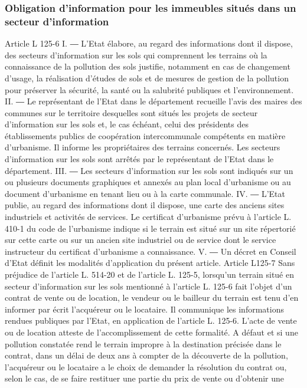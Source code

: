 \documentclass[11pt,a4paper]{report}
\begin{document}
	\subsubsection{Obligation d’information pour les immeubles situés dans un secteur d’information}
	Article L 125-6
	I. ― L'Etat élabore, au regard des informations dont il dispose, des secteurs d'information sur les sols qui
	comprennent les terrains où la connaissance de la pollution des sols justifie, notamment en cas de changement
	d'usage, la réalisation d'études de sols et de mesures de gestion de la pollution pour préserver la sécurité, la
	santé ou la salubrité publiques et l'environnement.
	II. ― Le représentant de l'Etat dans le département recueille l'avis des maires des communes sur le territoire
	desquelles sont situés les projets de secteur d'information sur les sols et, le cas échéant, celui des présidents des
	établissements publics de coopération intercommunale compétents en matière d'urbanisme. Il informe les
	propriétaires des terrains concernés.
	Les secteurs d'information sur les sols sont arrêtés par le représentant de l'Etat dans le département.
	III. ― Les secteurs d'information sur les sols sont indiqués sur un ou plusieurs documents graphiques et annexés
	au plan local d'urbanisme ou au document d'urbanisme en tenant lieu ou à la carte communale.
	IV. ― L'Etat publie, au regard des informations dont il dispose, une carte des anciens sites industriels et
	activités de services. Le certificat d'urbanisme prévu à l'article L. 410-1 du code de l'urbanisme indique si le
	terrain est situé sur un site répertorié sur cette carte ou sur un ancien site industriel ou de service dont le service
	instructeur du certificat d'urbanisme a connaissance.
	V. ― Un décret en Conseil d'Etat définit les modalités d'application du présent article.
	Article L125-7
	Sans préjudice de l'article L. 514-20 et de l'article L. 125-5, lorsqu'un terrain situé en secteur d'information sur
	les sols mentionné à l'article L. 125-6 fait l'objet d'un contrat de vente ou de location, le vendeur ou le bailleur
	du terrain est tenu d'en informer par écrit l'acquéreur ou le locataire. Il communique les informations rendues
	publiques par l'Etat, en application de l'article L. 125-6. L'acte de vente ou de location atteste de
	l'accomplissement de cette formalité.
	A défaut et si une pollution constatée rend le terrain impropre à la destination précisée dans le contrat, dans un
	délai de deux ans à compter de la découverte de la pollution, l'acquéreur ou le locataire a le choix de demander
	la résolution du contrat ou, selon le cas, de se faire restituer une partie du prix de vente ou d'obtenir une
\end{document}
